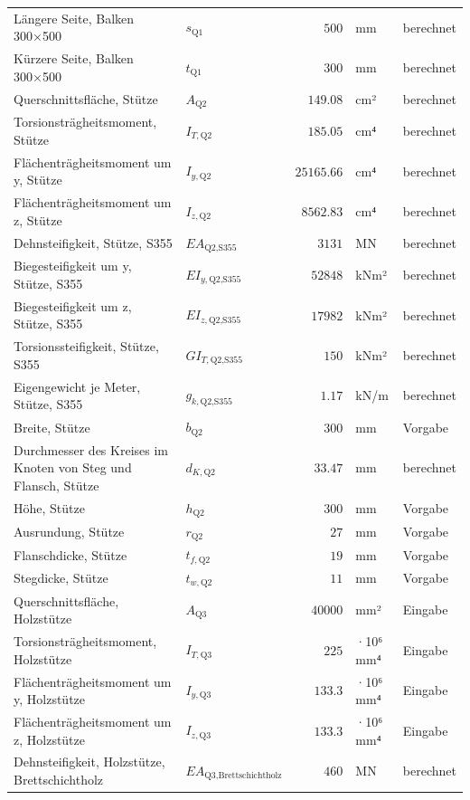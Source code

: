 \documentclass[11pt,a4paper]{article}
\begin{document}
\begin{xltabular}{\linewidth}{>{\raggedright\arraybackslash}Xlrll}
Längere Seite, Balken 300×500 & $s_{\text{Q1}}$ & $500$ & mm & berechnet \\
Kürzere Seite, Balken 300×500 & $t_{\text{Q1}}$ & $300$ & mm & berechnet \\
Querschnittsfläche, Stütze & $A_{\text{Q2}}$ & $149.08$ & cm² & berechnet \\
Torsionsträgheitsmoment, Stütze & $I_{T,\text{Q2}}$ & $185.05$ & cm⁴ & berechnet \\
Flächenträgheitsmoment um y, Stütze & $I_{y,\text{Q2}}$ & $25165.66$ & cm⁴ & berechnet \\
Flächenträgheitsmoment um z, Stütze & $I_{z,\text{Q2}}$ & $8562.83$ & cm⁴ & berechnet \\
Dehnsteifigkeit, Stütze, S355 & $EA_{\text{Q2,S355}}$ & $3131$ & MN & berechnet \\
Biegesteifigkeit um y, Stütze, S355 & $EI_{y,\text{Q2,S355}}$ & $52848$ & kNm² & berechnet \\
Biegesteifigkeit um z, Stütze, S355 & $EI_{z,\text{Q2,S355}}$ & $17982$ & kNm² & berechnet \\
Torsionssteifigkeit, Stütze, S355 & $GI_{T,\text{Q2,S355}}$ & $150$ & kNm² & berechnet \\
Eigengewicht je Meter, Stütze, S355 & $g_{k,\text{Q2,S355}}$ & $1.17$ & kN/m & berechnet \\
Breite, Stütze & $b_{\text{Q2}}$ & $300$ & mm & Vorgabe \\
Durchmesser des Kreises im Knoten von Steg und Flansch, Stütze & $d_{K,\text{Q2}}$ & $33.47$ & mm & berechnet \\
Höhe, Stütze & $h_{\text{Q2}}$ & $300$ & mm & Vorgabe \\
Ausrundung, Stütze & $r_{\text{Q2}}$ & $27$ & mm & Vorgabe \\
Flanschdicke, Stütze & $t_{f,\text{Q2}}$ & $19$ & mm & Vorgabe \\
Stegdicke, Stütze & $t_{w,\text{Q2}}$ & $11$ & mm & Vorgabe \\
Querschnittsfläche, Holzstütze & $A_{\text{Q3}}$ & $40000$ & mm² & Eingabe \\
Torsionsträgheitsmoment, Holzstütze & $I_{T,\text{Q3}}$ & $225$ & ·10⁶ mm⁴ & Eingabe \\
Flächenträgheitsmoment um y, Holzstütze & $I_{y,\text{Q3}}$ & $133.3$ & ·10⁶ mm⁴ & Eingabe \\
Flächenträgheitsmoment um z, Holzstütze & $I_{z,\text{Q3}}$ & $133.3$ & ·10⁶ mm⁴ & Eingabe \\
Dehnsteifigkeit, Holzstütze, Brettschichtholz & $EA_{\text{Q3,Brettschichtholz}}$ & $460$ & MN & berechnet \\

\end{xltabular}
\end{document}
